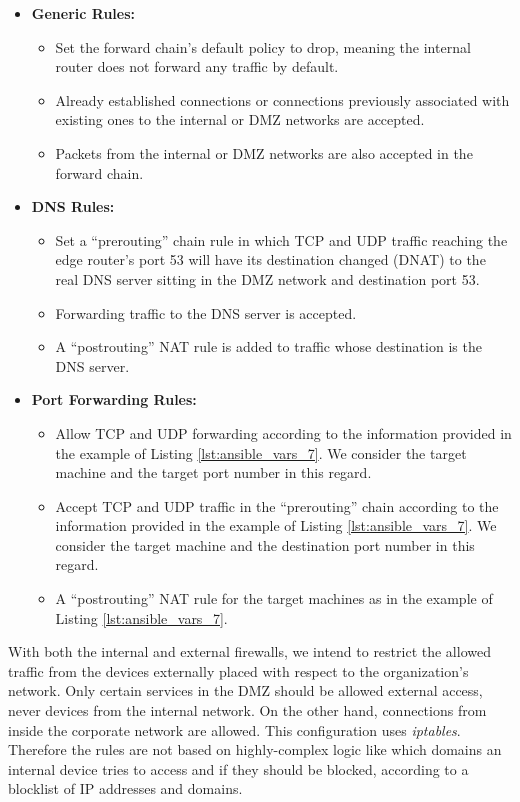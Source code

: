 \begin{itemize}
    \item \textbf{Generic Rules:}
        \begin{itemize}
            \item Set the forward chain's default policy to drop, meaning the internal router does not forward any traffic by default.
            \item Already established connections or connections previously associated with existing ones to the internal or DMZ networks are accepted.
            \item Packets from the internal or DMZ networks are also accepted in the forward chain.
        \end{itemize}
    \item \textbf{DNS Rules:}
        \begin{itemize}
            \item Set a ``prerouting'' chain rule in which TCP and UDP traffic reaching the edge router's port 53 will have its destination changed (DNAT) to the real DNS server sitting in the DMZ network and destination port 53.
            \item Forwarding traffic to the DNS server is accepted.
            \item A ``postrouting'' NAT rule is added to traffic whose destination is the DNS server.
        \end{itemize}
    \item \textbf{Port Forwarding Rules:}
        \begin{itemize}
            \item Allow TCP and UDP forwarding according to the information provided in the example of Listing \ref{lst:ansible_vars_7}. We consider the target machine and the target port number in this regard.
            \item Accept TCP and UDP traffic in the ``prerouting'' chain according to the information provided in the example of Listing \ref{lst:ansible_vars_7}. We consider the target machine and the destination port number in this regard.
            \item A ``postrouting'' NAT rule for the target machines as in the example of Listing \ref{lst:ansible_vars_7}.
        \end{itemize}
\end{itemize}

With both the internal and external firewalls, we intend to restrict the allowed traffic from the devices externally placed with respect to the organization's network. Only certain services in the DMZ should be allowed external access, never devices from the internal network. On the other hand, connections from inside the corporate network are allowed. This configuration uses \textit{iptables}. Therefore the rules are not based on highly-complex logic like which domains an internal device tries to access and if they should be blocked, according to a blocklist of IP addresses and domains.

